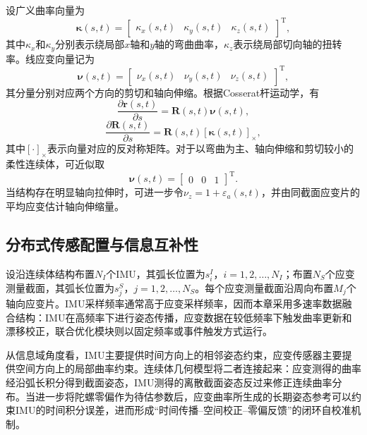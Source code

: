 设广义曲率向量为
\begin{equation}
    \bm\kappa(s,t)=
    \begin{bmatrix}
        \kappa_x(s,t) & \kappa_y(s,t) & \kappa_z(s,t)
    \end{bmatrix}^{\mathrm T},
\end{equation}
其中$\kappa_x$和$\kappa_y$分别表示绕局部$x$轴和$y$轴的弯曲曲率，$\kappa_z$表示绕局部切向轴的扭转率。线应变向量记为
\begin{equation}
    \bm\nu(s,t)=
    \begin{bmatrix}
        \nu_x(s,t) & \nu_y(s,t) & \nu_z(s,t)
    \end{bmatrix}^{\mathrm T},
\end{equation}
其分量分别对应两个方向的剪切和轴向伸缩。根据Cosserat杆运动学，有
\begin{equation}
    \frac{\partial \bm r(s,t)}{\partial s}
    =\bm R(s,t)\bm\nu(s,t),
    \label{eq:cosserat_position}
\end{equation}
\begin{equation}
    \frac{\partial \bm R(s,t)}{\partial s}
    =\bm R(s,t)\left[\bm\kappa(s,t)\right]_{\times},
    \label{eq:cosserat_orientation}
\end{equation}
其中$[\cdot]_{\times}$表示向量对应的反对称矩阵。对于以弯曲为主、轴向伸缩和剪切较小的柔性连续体，可近似取
\begin{equation}
    \bm\nu(s,t)=
    \begin{bmatrix}
        0 & 0 & 1
    \end{bmatrix}^{\mathrm T}.
    \label{eq:inextensible_assumption}
\end{equation}
当结构存在明显轴向拉伸时，可进一步令$\nu_z=1+\varepsilon_a(s,t)$，并由同截面应变片的平均应变估计轴向伸缩量。

\subsection{分布式传感配置与信息互补性}

设沿连续体结构布置$N_I$个IMU，其弧长位置为$s_i^I$，$i=1,2,\ldots,N_I$；布置$N_S$个应变测量截面，其弧长位置为$s_j^S$，$j=1,2,\ldots,N_S$。每个应变测量截面沿周向布置$M_j$个轴向应变片。IMU采样频率通常高于应变采样频率，因而本章采用多速率数据融合结构：IMU在高频率下进行姿态传播，应变数据在较低频率下触发曲率更新和漂移校正，联合优化模块则以固定频率或事件触发方式运行。

从信息域角度看，IMU主要提供时间方向上的相邻姿态约束，应变传感器主要提供空间方向上的局部曲率约束。连续体几何模型将二者连接起来：应变测得的曲率经沿弧长积分得到截面姿态，IMU测得的离散截面姿态反过来修正连续曲率分布。当进一步将陀螺零偏作为待估参数后，应变曲率所生成的长期姿态参考可以约束IMU的时间积分误差，进而形成“时间传播--空间校正--零偏反馈”的闭环自校准机制。

